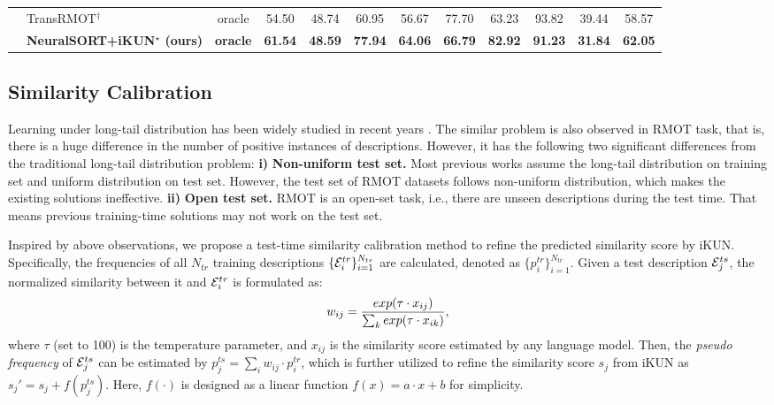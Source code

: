 \documentclass[10pt,twocolumn,letterpaper]{article}
\begin{document}
\begin{table}[t]
\begin{center}
{\begin{tabular}{cl|c|c|c|c|c|c|c|c|c|c}
            & TransRMOT$^\dagger$ \cite{wu2023referring}          & oracle                                        & 54.50 & 48.74 & 60.95 & 56.67 & 77.70 & 63.23 & 93.82 & 39.44 & 58.57 \\
            & \textbf{NeuralSORT+iKUN$^\star$ (ours)}             & \textbf{oracle}                               & \textbf{61.54} & \textbf{48.59} & \textbf{77.94} 
                                                                  & \textbf{64.06} & \textbf{66.79} & \textbf{82.92} & \textbf{91.23} & \textbf{31.84} & \textbf{62.05} \\
            \bottomrule[1pt]
        \end{tabular}
        }
    \end{center}
  \end{table}

\subsection{Similarity Calibration}
\label{sec_sc}
    Learning under long-tail distribution has been widely studied in recent years \cite{cui2019class, hyun2022long, zhao2023mdcs, du2023superdisco, du2023no}.
    The similar problem is also observed in RMOT task, that is, 
    there is a huge difference in the number of positive instances of descriptions.  %
    However, it has the following two significant differences from the traditional long-tail distribution problem:
    \textbf{i)} \textbf{Non-uniform test set.}
    Most previous works assume the long-tail distribution on training set and uniform distribution on test set.
    However, the test set of RMOT datasets follows non-uniform distribution, which makes the existing solutions ineffective.
    \textbf{ii)} \textbf{Open test set.} 
    RMOT is an open-set task, i.e., there are unseen descriptions during the test time.
    That means previous training-time solutions may not work on the test set.

    Inspired by above observations, we propose a test-time similarity calibration method to refine the predicted similarity score by iKUN.
    Specifically, the frequencies of all $N_{tr}$ training descriptions $\{ {\cal E}_i^{tr} \}_{i=1}^{N_{tr}}$ are calculated, denoted as $\{ p_i^{tr} \}_{i=1}^{N_{tr}}$.
    Given a test description ${\cal E}_j^{ts}$, the normalized similarity between it and ${\cal E}_i^{tr}$ is formulated as:
    \begin{equation}
        w_{ij} = {exp(\tau \cdot x_{ij}) \over {\sum_k exp(\tau \cdot x_{ik})}}, \label{eq3}
    \end{equation}
    where $\tau$ (set to 100) is the temperature parameter, and $x_{ij}$ is the similarity score estimated by any language model.
    Then, the \textit{pseudo frequency} of ${\cal E}_j^{ts}$ can be estimated by $p_j^{ts} = \sum_i w_{ij} \cdot p_i^{tr}$,
    which is further utilized to refine the similarity score $s_j$ from iKUN as $s_j' = s_j + f(p_j^{ts})$.
    Here, $f(\cdot)$ is designed as a linear function $f(x) = a \cdot x + b$ for simplicity.
\end{document}
